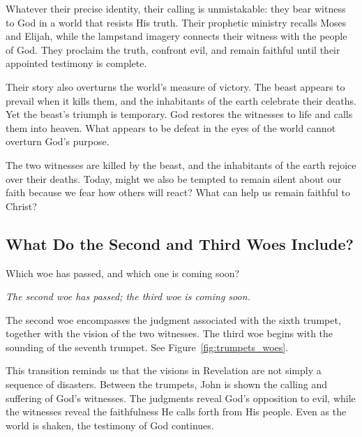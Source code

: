 Whatever their precise identity, their calling is unmistakable: they bear witness to God in a world that resists His truth. Their prophetic ministry recalls Moses and Elijah, while the lampstand imagery connects their witness with the people of God. They proclaim the truth, confront evil, and remain faithful until their appointed testimony is complete.

Their story also overturns the world's measure of victory. The beast appears to prevail when it kills them, and the inhabitants of the earth celebrate their deaths. Yet the beast's triumph is temporary. God restores the witnesses to life and calls them into heaven. What appears to be defeat in the eyes of the world cannot overturn God's purpose.

\begin{ReaderQuestion}
The two witnesses are killed by the beast, and the inhabitants of the earth rejoice over their deaths. Today, might we also be tempted to remain silent about our faith because we fear how others will react? What can help us remain faithful to Christ?
\end{ReaderQuestion}

\subsection{What Do the Second and Third Woes Include?}

\begin{ScriptureBox2}{Which woe has passed, and which one is coming soon?}

\item[11:14] \textit{The second woe has passed; the third woe is coming soon.}

\end{ScriptureBox2}

The second woe encompasses the judgment associated with the sixth trumpet, together with the vision of the two witnesses. The third woe begins with the sounding of the seventh trumpet. See Figure~\ref{fig:trumpets_woes}.

This transition reminds us that the visions in Revelation are not simply a sequence of disasters. Between the trumpets, John is shown the calling and suffering of God's witnesses. The judgments reveal God's opposition to evil, while the witnesses reveal the faithfulness He calls forth from His people. Even as the world is shaken, the testimony of God continues.


